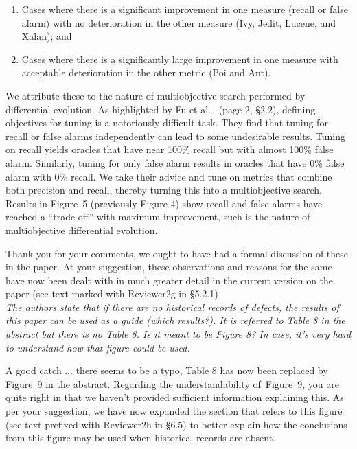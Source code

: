 \documentclass[twocolumn,5p]{elsarticle}
\newcommand{\be}{\begin{enumerate}}
\newcommand{\ee}{\end{enumerate}}
\newcommand{\tion}[1]{\S#1}
\newcommand{\fig}[1]{Figure~#1}
\newcommand{\review}[1]{\noindent\textit{#1\\}}
\theoremstyle{break}
\begin{document}
\be 

\item Cases where there is a significant 
improvement in one measure (recall or false alarm) with no deterioration in 
the other measure (Ivy, Jedit, Lucene, and Xalan); and 

\item Cases where there is a significantly large improvement in one measure 
with acceptable deterioration in the other metric (Poi and Ant).

\ee

\noindent We attribute these to the nature of multiobjective search 
performed by 
differential evolution. As highlighted by Fu et 
al.~\cite{fu:ase15} (page 2, \S2.2), defining objectives for tuning is a 
notoriously 
difficult task. They find that tuning for recall or false alarms 
independently can lead to some undesirable results. Tuning on recall yields 
oracles that have near 100\% recall but with almost 100\% false alarm. 
Similarly, tuning for only false alarm results in oracles that have 0\% 
false alarm with 0\% recall. We take their advice and tune on metrics that 
combine both precision and recall, thereby turning this into a 
multiobjective search. Results in \fig{5} (previously Figure 4) show recall 
and false alarms have reached a ``trade-off'' with maximum improvement, 
such 
is the nature of multiobjective differential evolution.


Thank you for your comments, we ought to have had a formal discussion of 
these in the paper. At your suggestion, these observations and reasons for 
the same have now been dealt with in much greater detail in the current 
version on the paper (see text marked with {\color{steel} Reviewer2g} in 
\tion{5.2.1})
\\


\review{The authors state that if there are no historical records of 
	defects, the results of this paper can be used as a guide (which results?). 
	It is referred to Table 8 in the abstract but there is no Table 8. Is it 
	meant to be Figure 8? In case, it’s very hard to understand how that figure 
	could be used.}

A good catch ... there seems to be a typo, Table 8 has now 
been replaced by \fig{9} in the abstract. Regarding the 
understandability 
of~\fig{9}, you are quite right in that we haven't provided 
sufficient information explaining this. As per your suggestion, we have now 
expanded the section that refers to this 
figure (see text prefixed with {\color{steel} Reviewer2h} in 
\tion{6.5}) to better explain how the 
conclusions 
from this figure may be used when historical records are absent.
	\balance


\end{document}
